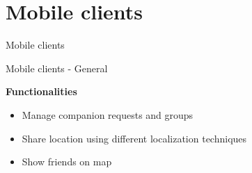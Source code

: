 \documentclass[11pt]{beamer}
\begin{document}
\section{Mobile clients}


\begin{frame}{}

  \begin{center}

    {\Huge Mobile clients}

  \end{center}

\end{frame}

\begin{frame}{Mobile clients - General}

  \textbf{Functionalities}\\[1em]
  \begin{itemize}
    \item Manage companion requests and groups
    \item Share location using different localization techniques
    \item Show friends on map

  \end{itemize}

\end{frame}
\end{document}
